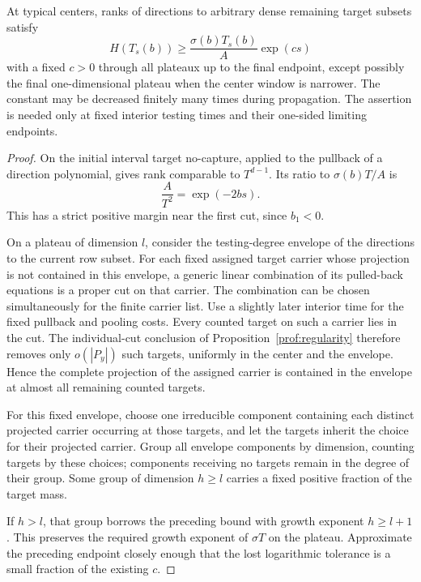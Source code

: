 \begin{lemma}\label{sc:separated-rank}
At typical centers, ranks of directions to arbitrary dense
remaining target subsets satisfy
\begin{equation}\label{sc:strict-rank}
 H(T_s(b))\ge\frac{\sigma(b)T_s(b)}A\exp(c s)
\end{equation}
with a fixed $c>0$ through all plateaux up to the final
endpoint, except possibly the final one-dimensional
plateau when the center window is narrower.  The constant
may be decreased finitely many times during propagation.
The assertion is needed only at fixed interior testing
times and their one-sided limiting endpoints.
\end{lemma}

\begin{proof}
On the initial interval target no-capture, applied to the
pullback of a direction polynomial, gives rank comparable
to $T^{d-1}$.  Its ratio to $\sigma(b)T/A$ is
\[
 \frac{A}{T^2}=\exp(-2bs).
\]
This has a strict positive margin near the first cut,
since $b_1<0$.

On a plateau of dimension $l$, consider the testing-degree envelope of
the directions to the current row subset.  For each fixed assigned target
carrier whose projection is not contained in this envelope, a generic
linear combination of its pulled-back equations is a proper cut on that
carrier.  The combination can be chosen simultaneously for the finite
carrier list.  Use a slightly later interior time for the fixed pullback
and pooling costs.  Every counted target on such a carrier lies in the
cut.  The individual-cut conclusion
of Proposition~\ref{prof:regularity} therefore removes only $o(|P_y|)$
such targets, uniformly in the center and the envelope.  Hence the
complete projection of the assigned carrier is contained in the envelope
at almost all remaining counted targets.

For this fixed envelope, choose one irreducible component containing each
distinct projected carrier occurring at those targets, and let the targets
inherit the choice for their projected carrier.  Group all envelope
components by dimension, counting targets by these choices; components
receiving no targets remain in the degree of their group.  Some group of
dimension $h\ge l$ carries a fixed positive fraction of the target mass.

If $h>l$, that group borrows the preceding bound with growth exponent
$h\ge l+1$.  This preserves the required growth exponent of $\sigma T$
on the plateau.  Approximate the preceding endpoint closely enough that
the lost logarithmic tolerance is a small fraction of the existing $c$.


\end{proof}
